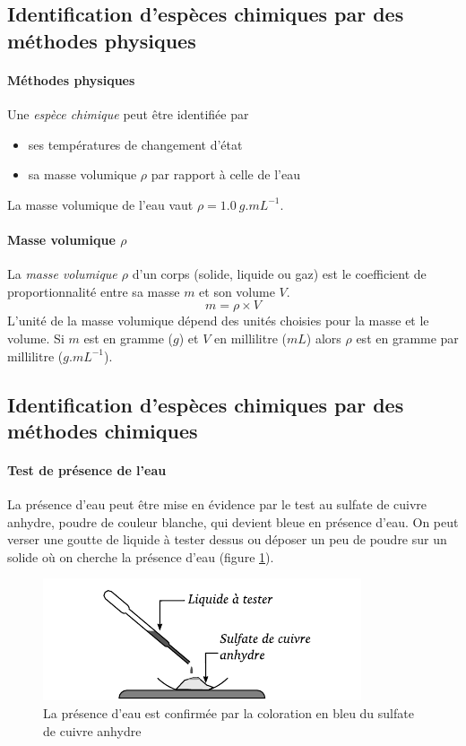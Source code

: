 \subsection{Identification d'espèces chimiques par des méthodes physiques}
\paragraph{Méthodes physiques} Une \textit{espèce chimique} peut être identifiée 
par
\begin{itemize}
 \item ses températures de changement d'état
 \item sa masse volumique $ \rho$ par rapport à celle de l'eau 
\end{itemize}
La masse volumique de l'eau vaut $ \rho = 1.0~g.mL^{-1}$.

\paragraph{Masse volumique $\rho$} La \textit{masse volumique $\rho$} d'un corps (solide, liquide ou gaz) est le coefficient de proportionnalité entre sa masse $m$ et son volume $V$. 
$$ m = \rho \times V$$
L'unité de la masse volumique dépend des unités choisies pour la masse et le volume. Si $m$ est en gramme ($g$) et $V$ en millilitre ($mL$) alors $\rho$ est en gramme par millilitre ($g.mL^{-1}$).


\subsection{Identification d'espèces chimiques par des méthodes chimiques}
\paragraph{Test de présence de l'eau} 
La présence d'eau peut être mise en évidence par le test au sulfate de cuivre anhydre, poudre de
couleur blanche, qui devient bleue en présence d'eau. On peut verser une goutte de liquide à 
tester dessus ou déposer un peu de poudre sur un solide où on cherche la présence d'eau (figure 
\ref{fig:test_presence_eau}).
\begin{figure}[h]
  \begin{center}
      \includegraphics[width=\columnwidth]{1.1.-melanges/test_presence_eau.pdf}
  \end{center}
  \caption{La présence d'eau est confirmée par la coloration en bleu du sulfate de cuivre anhydre}
  \label{fig:test_presence_eau}
\end{figure}

